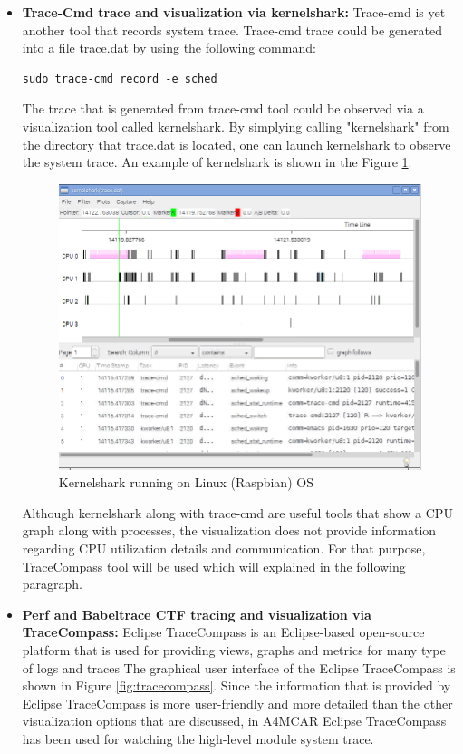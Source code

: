 \begin{itemize}
	\item \textbf{Trace-Cmd trace and visualization via kernelshark:}
	Trace-cmd \cite{tracecmd} is yet another tool that records system trace. Trace-cmd trace could be generated into a file trace.dat by using the following command:
	\begin{lstlisting}[style=bash]
		sudo trace-cmd record -e sched
	\end{lstlisting}
	The trace that is generated from trace-cmd tool could be observed via a visualization tool called kernelshark. By simplying calling "kernelshark" from the directory that trace.dat is located, one can launch kernelshark to observe the system trace. An example of kernelshark is shown in the Figure \ref{fig:kernelshark}.
	\begin{figure}[!ht]
		\centering
		\captionsetup{justification=centering}
		\includegraphics[scale=0.55]{content/images/kernelshark.png}
		\caption{Kernelshark running on Linux (Raspbian) OS}
		\label{fig:kernelshark}
	\end{figure}
	Although kernelshark along with trace-cmd are useful tools that show a CPU graph along with processes, the visualization does not provide information regarding CPU utilization details and communication. For that purpose, TraceCompass tool will be used which will explained in the following paragraph. 
	\item \textbf{Perf and Babeltrace CTF tracing and visualization via TraceCompass:} 	Eclipse TraceCompass \cite{tracecompass} is an Eclipse-based open-source platform that is used for providing views, graphs and metrics for many type of logs and traces \cite{tracecompass} The graphical user interface of the Eclipse TraceCompass is shown in Figure \ref{fig:tracecompass}. Since the information that is provided by Eclipse TraceCompass is more user-friendly and more detailed than the other visualization options that are discussed, in A4MCAR Eclipse TraceCompass has been used for watching the high-level module system trace.
	

\end{itemize}

